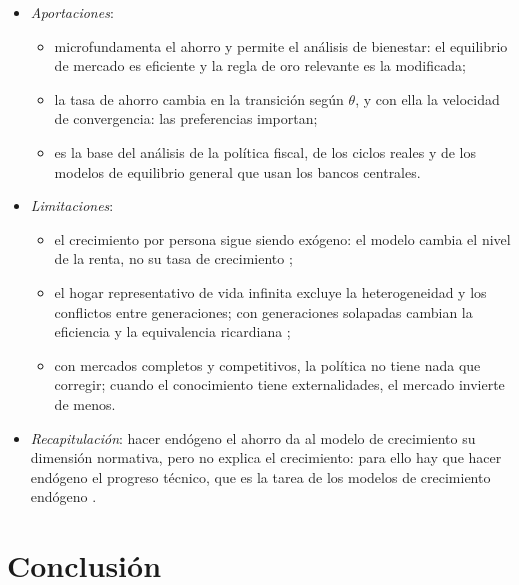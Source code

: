 \documentclass[11pt]{article}
\begin{document}
\begin{itemize}
\item \emph{Aportaciones}:
  \begin{itemize}
  \item microfundamenta el ahorro y permite el análisis de bienestar: el equilibrio de mercado es eficiente y la regla de oro relevante es la modificada;
  \item la tasa de ahorro cambia en la transición según $\theta$, y con ella la velocidad de convergencia: las preferencias importan;
  \item es la base del análisis de la política fiscal, de los ciclos reales y de los modelos de equilibrio general que usan los bancos centrales.
  \end{itemize}
\item \emph{Limitaciones}:
  \begin{itemize}
  \item el crecimiento por persona sigue siendo exógeno: el modelo cambia el nivel de la renta, no su tasa de crecimiento ;
  \item el hogar representativo de vida infinita excluye la heterogeneidad y los conflictos entre generaciones; con generaciones solapadas cambian la eficiencia y la equivalencia ricardiana ;
  \item con mercados completos y competitivos, la política no tiene nada que corregir; cuando el conocimiento tiene externalidades, el mercado invierte de menos.
  \end{itemize}
\item \emph{Recapitulación}: hacer endógeno el ahorro da al modelo de crecimiento su dimensión normativa, pero no explica el crecimiento: para ello hay que hacer endógeno el progreso técnico, que es la tarea de los modelos de crecimiento endógeno .
\end{itemize}

\section*{Conclusión}
\end{document}
